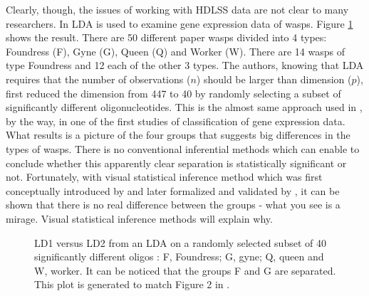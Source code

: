 
{\color{red} Clearly, though, the issues of working with HDLSS data are not clear to many researchers.} In \cite{toth:2010} LDA is used to examine gene expression data of wasps. Figure \ref{oligo} shows the result. There are 50 different paper wasps divided into 4 types: Foundress (F), Gyne (G), Queen (Q) and Worker (W). There are 14  wasps of type Foundress and 12 each of the other 3 types. The authors, knowing that LDA requires that the number of observations ($n$) should be larger than dimension ($p$), first reduced the dimension from 447 to 40 by randomly selecting a subset of significantly different oligonucleotides. This is the almost same approach used in \cite{dudoit:2002}, by the way, in one of the first studies of classification of gene expression data. What results is a picture of the four groups that suggests big differences in the types of wasps. There is no conventional inferential methods which can enable to conclude whether this apparently clear separation is statistically significant or not.  Fortunately, with visual statistical inference method which was first conceptually introduced by \cite{buja:2009} and later formalized and validated by \cite{majumder:2011}, it can be shown that there is no real difference between the groups - what you see is a mirage. Visual statistical inference methods will explain why. 

\begin{figure}[hbtp]
   \centering
       \caption{LD1 versus LD2 from an LDA on a randomly selected subset of 40 significantly different oligos : F, Foundress; G, gyne; Q, queen and W, worker. It can be noticed that the groups F and G are separated. This plot is generated to match Figure 2 in \cite{toth:2010}. }
     \label{oligo}
\end{figure}  

